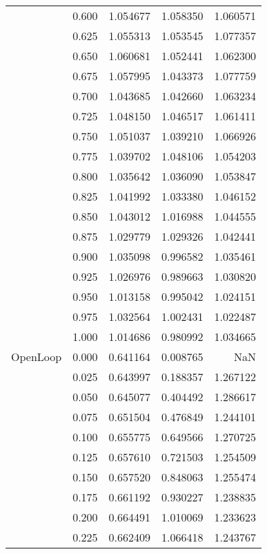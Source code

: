 \begin{tabular}{llrrr}
         & 0.600 &   1.054677 &   1.058350 &   1.060571 \\
         & 0.625 &   1.055313 &   1.053545 &   1.077357 \\
         & 0.650 &   1.060681 &   1.052441 &   1.062300 \\
         & 0.675 &   1.057995 &   1.043373 &   1.077759 \\
         & 0.700 &   1.043685 &   1.042660 &   1.063234 \\
         & 0.725 &   1.048150 &   1.046517 &   1.061411 \\
         & 0.750 &   1.051037 &   1.039210 &   1.066926 \\
         & 0.775 &   1.039702 &   1.048106 &   1.054203 \\
         & 0.800 &   1.035642 &   1.036090 &   1.053847 \\
         & 0.825 &   1.041992 &   1.033380 &   1.046152 \\
         & 0.850 &   1.043012 &   1.016988 &   1.044555 \\
         & 0.875 &   1.029779 &   1.029326 &   1.042441 \\
         & 0.900 &   1.035098 &   0.996582 &   1.035461 \\
         & 0.925 &   1.026976 &   0.989663 &   1.030820 \\
         & 0.950 &   1.013158 &   0.995042 &   1.024151 \\
         & 0.975 &   1.032564 &   1.002431 &   1.022487 \\
         & 1.000 &   1.014686 &   0.980992 &   1.034665 \\
OpenLoop & 0.000 &   0.641164 &   0.008765 &        NaN \\
         & 0.025 &   0.643997 &   0.188357 &   1.267122 \\
         & 0.050 &   0.645077 &   0.404492 &   1.286617 \\
         & 0.075 &   0.651504 &   0.476849 &   1.244101 \\
         & 0.100 &   0.655775 &   0.649566 &   1.270725 \\
         & 0.125 &   0.657610 &   0.721503 &   1.254509 \\
         & 0.150 &   0.657520 &   0.848063 &   1.255474 \\
         & 0.175 &   0.661192 &   0.930227 &   1.238835 \\
         & 0.200 &   0.664491 &   1.010069 &   1.233623 \\
         & 0.225 &   0.662409 &   1.066418 &   1.243767 \\

\end{tabular}
